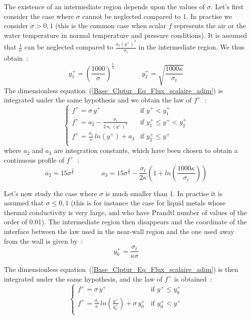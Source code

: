 The existence of an intermediate region depends upon the 
values of $\sigma$.
Let's first consider the case where $\sigma$ cannot be neglected 
compared to 1. In practise we consider  $\sigma > 0,1$ 
(this is the common case when scalar $f$ represents
the air or the water temperature in normal temperature 
and pressure conditions). It is assumed that 
$\displaystyle\frac{1}{\sigma}$ can be neglected compared to 
$\displaystyle\frac{a_1 (y^+)^3}{\sigma_t}$ in the 
intermediate region.
We thus obtain~:
\begin{equation}
  y^+_1 =\left(\displaystyle\frac{1000}{\sigma}\right)^\frac{1}{3} \qquad\qquad
  y^+_2 = \sqrt{\displaystyle\frac{1000\kappa}{\sigma_t}}
\end{equation}
The dimensionless equation~(\ref{Base_Clptur_Eq_Flux_scalaire_adim})
is integrated under the same hypothesis and we obtain the law of $f^+$~:
\begin{equation}
\left\{
\begin{array}{ll}
f^+ = \sigma \,y^+ & \text{if } y^+ < y^+_1 \\
f^+ = a_2 -\displaystyle\frac{\sigma_t}{2\,a_1\,(y^+)^2}& \text{if } y_1^+ \leqslant y^+ < y_2^+ \\
f^+ = \displaystyle\frac{\sigma_t}{\kappa}\,ln(y^+)+a_3& \text{if } y^+_2 \leqslant y^+\\
\end{array}
\right.
\end{equation}
where $a_2$ and $a_3$ are integration constants,
which have been chosen to obtain 
a continuous  profile of $f^+$~:
\begin{equation}
a_2=15\sigma^{\frac{2}{3}}\qquad\qquad
a_3=15\sigma^{\frac{2}{3}}-\displaystyle\frac{\sigma_t}{2\kappa}
\left(1+
ln\left(\displaystyle\frac{1000\kappa}{\sigma_t}\right)\right)
\end{equation}

Let's now study the case where  $\sigma$ is much smaller than 1. 
In practise it is assumed that $\sigma \leqslant 0,1$ (this is for 
instance the case for liquid metals whose thermal conductivity is very 
large, and who have Prandtl number of values of the order of 0.01).
The intermediate region then disappears and the coordinate of the 
interface between the law used in the near-wall region and the one
used away from the wall is given by~: 
\begin{equation}
y^+_0= \displaystyle\frac{\sigma_t}{\kappa\sigma}
\end{equation}

The dimensionless equation~(\ref{Base_Clptur_Eq_Flux_scalaire_adim})
is then integrated under the same hypothesis, and the law of 
 $f^+$ is obtained~:
\begin{equation}
\left\{
\begin{array}{ll}
f^+ = \sigma \,y^+ & \text{if } y^+ \leqslant y^+_0 \\
f^+ = \displaystyle\frac{\sigma_t}{\kappa}\,
        ln\left(\displaystyle\frac{y^+}{y^+_0}\right)+\sigma \,y^+_0
                   & \text{if } y^+_0 < y^+\\
\end{array}
\right.
\end{equation}


